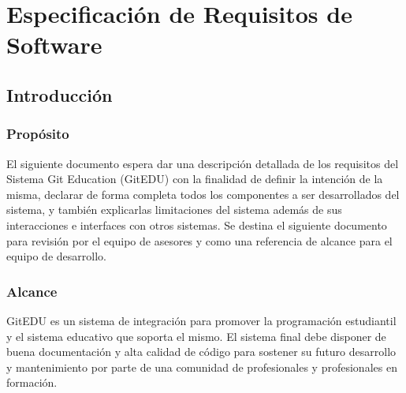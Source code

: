 

\chapter{Especificación de Requisitos de Software}
\label{ersDoc}
\label{AnexoB}

\section{Introducción}

\subsection{Propósito}
El siguiente documento espera dar una descripción detallada de los requisitos del Sistema Git Education (GitEDU) con la finalidad de definir la intención de la misma, declarar de forma completa todos los componentes a ser desarrollados del sistema, y también explicarlas limitaciones del sistema además de sus interacciones e interfaces con otros sistemas. Se destina el siguiente documento para revisión por el equipo de asesores y como una referencia de alcance para el equipo de desarrollo.

\subsection{Alcance}
GitEDU es un sistema de integración para promover la programación estudiantil y el sistema educativo que soporta el mismo. El sistema final debe disponer de buena documentación y alta calidad de código para sostener su futuro desarrollo y mantenimiento por parte de una comunidad de profesionales y profesionales en formación.

